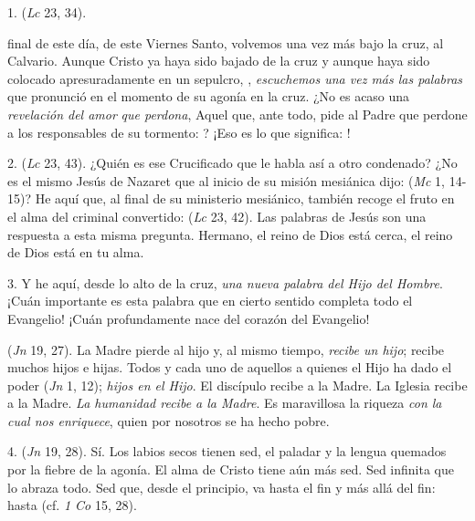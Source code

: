 
\begin{body}

1.  (\textit{Lc} 23, 34). 

 final de este día, de este Viernes Santo, volvemos una vez más bajo la cruz, al Calvario. Aunque Cristo ya haya sido bajado de la cruz y aunque haya sido colocado apresuradamente en un sepulcro, , \textit{escuchemos una vez más las palabras} que pronunció en el momento de su agonía en la cruz. ¿No es acaso una \textit{revelación del amor} \textit{que perdona}, Aquel que, ante todo, pide al Padre que perdone a los responsables de su tormento: ? ¡Eso es lo que significa: ! 

2.  (\textit{Lc} 23, 43). ¿Quién es ese Crucificado que le habla así a otro condenado? ¿No es el mismo Jesús de Nazaret que al inicio de su misión mesiánica dijo:  (\textit{Mc} 1, 14-15)? He aquí que, al final de su ministerio mesiánico, también recoge el fruto en el alma del criminal convertido:  (\textit{Lc} 23, 42). Las palabras de Jesús son una respuesta a esta misma pregunta. Hermano, el reino de Dios está cerca, el reino de Dios está en tu alma. 

3. Y he aquí, desde lo alto de la cruz, \textit{una nueva palabra del Hijo del Hombre}. ¡Cuán importante es esta palabra que en cierto sentido completa todo el Evangelio! ¡Cuán profundamente nace del corazón del Evangelio! 

 (\textit{Jn} 19, 27). La Madre pierde al hijo y, al mismo tiempo, \textit{recibe un hijo}; recibe muchos hijos e hijas. Todos y cada uno de aquellos a quienes el Hijo ha dado el poder  (\textit{Jn} 1, 12);\textit{ hijos en el Hijo}. El discípulo recibe a la Madre. La Iglesia recibe a la Madre. \textit{La humanidad recibe a la Madre}. Es maravillosa la riqueza \textit{con la cual nos enriquece}, quien por nosotros se ha hecho pobre. 

4.  (\textit{Jn} 19, 28). Sí. Los labios secos tienen sed, el paladar y la lengua quemados por la fiebre de la agonía. El alma de Cristo tiene aún más sed. Sed infinita que lo abraza todo. Sed que, desde el principio, va hasta el fin y más allá del fin: hasta  (cf. \textit{1 Co} 15, 28). 


\end{body}
